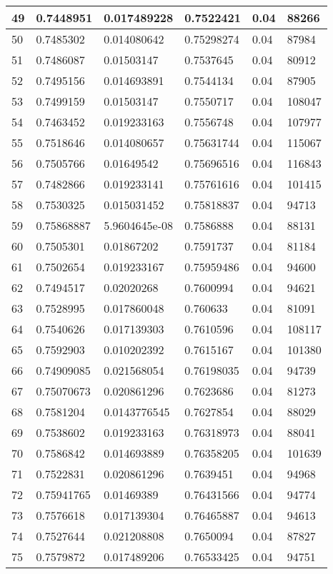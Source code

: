 \begin{longtable}{|l|l|l|l|l|l|}
49 & 0.7448951 & 0.017489228 & 0.7522421 & 0.04 & 88266 \\ \hline 
50 & 0.7485302 & 0.014080642 & 0.75298274 & 0.04 & 87984 \\ \hline 
51 & 0.7486087 & 0.01503147 & 0.7537645 & 0.04 & 80912 \\ \hline 
52 & 0.7495156 & 0.014693891 & 0.7544134 & 0.04 & 87905 \\ \hline 
53 & 0.7499159 & 0.01503147 & 0.7550717 & 0.04 & 108047 \\ \hline 
54 & 0.7463452 & 0.019233163 & 0.7556748 & 0.04 & 107977 \\ \hline 
55 & 0.7518646 & 0.014080657 & 0.75631744 & 0.04 & 115067 \\ \hline 
56 & 0.7505766 & 0.01649542 & 0.75696516 & 0.04 & 116843 \\ \hline 
57 & 0.7482866 & 0.019233141 & 0.75761616 & 0.04 & 101415 \\ \hline 
58 & 0.7530325 & 0.015031452 & 0.75818837 & 0.04 & 94713 \\ \hline 
59 & 0.75868887 & 5.9604645e-08 & 0.7586888 & 0.04 & 88131 \\ \hline 
60 & 0.7505301 & 0.01867202 & 0.7591737 & 0.04 & 81184 \\ \hline 
61 & 0.7502654 & 0.019233167 & 0.75959486 & 0.04 & 94600 \\ \hline 
62 & 0.7494517 & 0.02020268 & 0.7600994 & 0.04 & 94621 \\ \hline 
63 & 0.7528995 & 0.017860048 & 0.760633 & 0.04 & 81091 \\ \hline 
64 & 0.7540626 & 0.017139303 & 0.7610596 & 0.04 & 108117 \\ \hline 
65 & 0.7592903 & 0.010202392 & 0.7615167 & 0.04 & 101380 \\ \hline 
66 & 0.74909085 & 0.021568054 & 0.76198035 & 0.04 & 94739 \\ \hline 
67 & 0.75070673 & 0.020861296 & 0.7623686 & 0.04 & 81273 \\ \hline 
68 & 0.7581204 & 0.0143776545 & 0.7627854 & 0.04 & 88029 \\ \hline 
69 & 0.7538602 & 0.019233163 & 0.76318973 & 0.04 & 88041 \\ \hline 
70 & 0.7586842 & 0.014693889 & 0.76358205 & 0.04 & 101639 \\ \hline 
71 & 0.7522831 & 0.020861296 & 0.7639451 & 0.04 & 94968 \\ \hline 
72 & 0.75941765 & 0.01469389 & 0.76431566 & 0.04 & 94774 \\ \hline 
73 & 0.7576618 & 0.017139304 & 0.76465887 & 0.04 & 94613 \\ \hline 
74 & 0.7527644 & 0.021208808 & 0.7650094 & 0.04 & 87827 \\ \hline 
75 & 0.7579872 & 0.017489206 & 0.76533425 & 0.04 & 94751 \\ \hline 
\end{longtable}